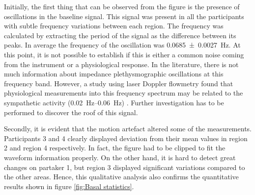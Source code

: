 Initially, the first thing that can be observed from the figure is the presence of oscillations in the baseline signal. This signal was present in all the participants with subtle frequency variations between each region. The frequency was calculated by extracting the period of the signal as the difference between its peaks. In average the frequency of the oscillation was \SI{0.0685(00027)}{\hertz}. At this point, it is not possible to establish if this is either a common noise coming from the instrument or a physiological response. In the literature, there is not much information about impedance plethysmographic oscillations at this frequency band.  However, a study using laser Doppler flowmetry found that physiological measurements into this frequency spectrum may be related to the sympathetic activity (\SIrange{0.02}{0.06}{\hertz}) \cite{kvandal2006low}. Further investigation has to be performed to discover the roof of this signal. 

Secondly, it is evident that the motion artefact altered some of the measurements. Participants 3 and 4 clearly displayed deviation from their mean values in region 2 and region 4 respectively. In fact, the figure had to be clipped to fit the waveform information properly. On the other hand, it is hard to detect great changes on partaker 1, but region 3 displayed significant variations compared to the other areas. Hence, this qualitative analysis also confirms the quantitative results shown in figure \ref{fig:Basal statistics}.  

